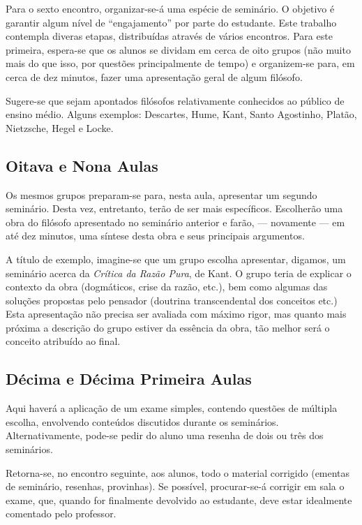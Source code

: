 \documentclass[12pt,a4paper]{article}
\begin{document}
	Para o sexto encontro, organizar-se-á uma espécie de seminário. 
	O objetivo é garantir algum nível de ``engajamento'' por parte 
	do estudante. Este trabalho contempla diveras etapas, distribuídas 
	através de vários encontros. Para este primeira, espera-se que 
	os alunos se dividam em cerca de oito grupos (não muito mais do que 
	isso, por questões principalmente de tempo) e organizem-se para, 
	em cerca de dez minutos, fazer uma apresentação geral de algum
	filósofo. 
	
	Sugere-se que sejam apontados filósofos relativamente conhecidos 
	ao público de ensino médio. Alguns exemplos: Descartes, Hume, 
	Kant, Santo Agostinho, Platão, Nietzsche, Hegel e Locke. 
	
	\subsection*{Oitava e Nona Aulas}
	
	Os mesmos grupos preparam-se para, nesta aula, apresentar um 
	segundo seminário. Desta vez, entretanto, terão de ser mais 
	específicos. Escolherão uma obra do filósofo apresentado no 
	seminário anterior e farão, --- novamente --- em até dez minutos, 
	uma síntese desta obra e seus principais argumentos. 
	
	A título de exemplo, imagine-se que um grupo escolha apresentar, 
	digamos, um seminário acerca da \textit{Crítica da Razão Pura}, 
	de Kant. O grupo teria de explicar o contexto da obra (dogmáticos, 
	crise da razão, etc.), bem como algumas das soluções propostas 
	pelo pensador (doutrina transcendental dos conceitos etc.) Esta 
	apresentação não precisa ser avaliada com máximo rigor, mas quanto 
	mais próxima a descrição do grupo estiver da essência da obra, 
	tão melhor será o conceito atribuído ao final. 
	
	\subsection*{Décima e Décima Primeira Aulas}
	
	Aqui haverá a aplicação de um exame simples, contendo questões 
	de múltipla escolha, envolvendo conteúdos discutidos durante os 
	seminários. Alternativamente, pode-se pedir do aluno uma resenha 
	de dois ou três dos seminários. 
	
	Retorna-se, no encontro seguinte, aos alunos, todo o material 
	corrigido (ementas de seminário, resenhas, provinhas). Se possível, 
	procurar-se-á corrigir em sala o exame, que, quando for finalmente 
	devolvido ao estudante, deve estar idealmente comentado 
	pelo professor. 
	
\end{document}
